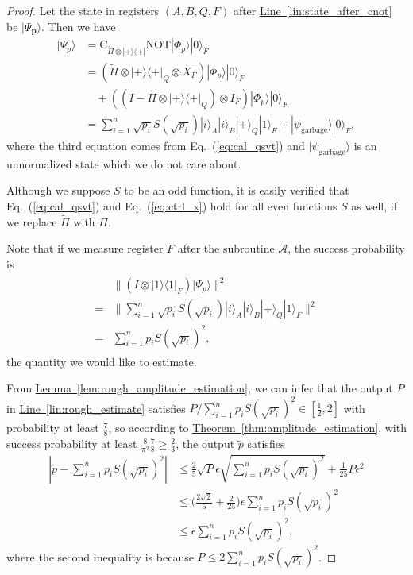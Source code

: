\documentclass[journal]{IEEEtran}
\newcommand{\eq}[1]{Eq.~(\ref{eq:#1})}
\newcommand{\thm}[1]{\hyperref[thm:#1]{Theorem~\ref*{thm:#1}}}
\newcommand{\lem}[1]{\hyperref[lem:#1]{Lemma~\ref*{lem:#1}}}
\newcommand{\lin}[1]{\hyperref[lin:#1]{Line~\ref*{lin:#1}}}
\begin{document}
\begin{proof}
Let the state in registers $(A,B,Q,F)$ after \lin{state_after_cnot} be $|\Psi_{\mathbf{p}}\rangle$. Then we have
\begin{align}
    \label{eq:ctrl_x}
    |\Psi_{p}\rangle
    & = \text{C}_{\widetilde{\Pi }\otimes|+\rangle\langle+|}\text{NOT}|\Phi_{p}\rangle|0\rangle_F \nonumber\\
    & = (\widetilde{\Pi }\otimes |+\rangle\langle+|_Q\otimes X_F)|\Phi_{p}\rangle|0\rangle_F \nonumber \\ &\quad+ ((I-\widetilde{\Pi }\otimes |+\rangle\langle+|_Q)\otimes I_F)|\Phi_{p}\rangle|0\rangle_F \nonumber\\
    & = \sum_{i=1}^{n} \sqrt{p_{i}} S\left(\sqrt{p_{i}}\right)|i\rangle_A|i\rangle_B|+\rangle_Q|1\rangle_F + |\psi_{\mathrm{garbage}}\rangle|0\rangle_F,
\end{align}
where the third equation comes from \eq{cal_qsvt} and $|\psi_{\mathrm{garbage}}\rangle$ is an unnormalized state which we do not care about.

Although we suppose $S$ to be an odd function, it is easily verified that \eq{cal_qsvt} and \eq{ctrl_x} hold for all even functions $S$ as well, if we replace $\widetilde{\Pi}$ with $\Pi$.

Note that if we measure register $F$ after the subroutine $\mathcal A$, the success probability is
\begin{align}
  \begin{aligned}
    &\|(I\otimes|1\rangle\langle1|_F)|\Psi_{p}\rangle \|^2\nonumber \\
=& \|\sum_{i=1}^{n} \sqrt{p_{i}} S\left(\sqrt{p_{i}}\right)|i\rangle_A|i\rangle_B|+\rangle_Q|1\rangle_F\|^2\nonumber \\ =& \sum_{i=1}^n p_iS(\sqrt{p_i})^2,
  \end{aligned}
\end{align}
the quantity we would like to estimate.

From \lem{rough_amplitude_estimation}, we can infer that the output $P$ in \lin{rough_estimate} satisfies $P/\sum_{i=1}^n p_iS(\sqrt{p_i})^2
\in[\frac{1}{2},2]$ with probability at least $\frac{7}{8}$, so according to \thm{amplitude_estimation}, with success probability at least $\frac{8}{\pi^2}\frac{7}{8}\ge \frac{2}{3}$, the output $\tilde{p}$ satisfies 
\begin{align}
    |\tilde{p}- \sum_{i=1}^n p_iS(\sqrt{p_i})^2| &\le \frac{2}{5}\sqrt{P}\epsilon \sqrt{\sum_{i=1}^n p_iS(\sqrt{p_i})^2} + \frac{1}{25} P\epsilon^2 \nonumber \\
    &\le \Big(\frac{2\sqrt{2}}{5} + \frac{2}{25}\Big) \epsilon\sum_{i=1}^n p_iS(\sqrt{p_i})^2 \nonumber \\ &\le  \epsilon\sum_{i=1}^n p_iS(\sqrt{p_i})^2,
\end{align}
where the second inequality is because $P \le 2\sum_{i=1}^n p_i S(\sqrt{p_i})^2$. 


\end{proof}
\end{document}
